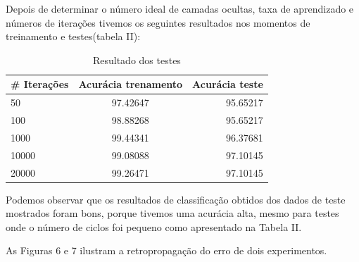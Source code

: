 \documentclass[conference]{IEEEtran}
\begin{document}
  Depois de determinar o número ideal de camadas ocultas, taxa de aprendizado e números de iterações tivemos os seguintes resultados nos momentos de treinamento e testes(tabela II):
     
    \begin{table}[h]
	\caption{Resultado dos testes}
	\begin{center}
    \begin{tabular}{l | c | r }
    \hline
         \# Iterações &Acurácia trenamento  & Acurácia teste \\\hline
         50 &97.42647  &95.65217    \\\hline
         100 &98.88268  &95.65217    \\\hline
         1000 &99.44341  &96.37681    \\\hline
         10000 &99.08088  &97.10145   \\\hline
         20000 &99.26471  &97.10145  \\\hline
    \end{tabular}
    \end{center}
    \end{table}
     
    
    Podemos observar que os resultados de classificação obtidos dos dados de teste mostrados foram bons, porque tivemos uma acurácia alta, mesmo para testes onde o número de ciclos foi pequeno como apresentado na Tabela II.
    
    As Figuras 6 e 7 ilustram a retropropagação do erro de dois experimentos.
    
\end{document}

